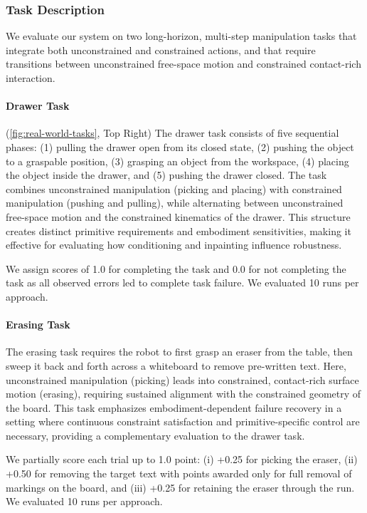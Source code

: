 \subsubsection{Task Description}  
We evaluate our system on two long-horizon, multi-step manipulation tasks that integrate both unconstrained and constrained actions, and that require transitions between unconstrained free-space motion and constrained contact-rich interaction. 

\paragraph{Drawer Task} (\cref{fig:real-world-tasks}, Top Right)
The drawer task consists of five sequential phases: (1) pulling the drawer open from its closed state, (2) pushing the object to a graspable position, (3) grasping an object from the workspace, (4) placing the object inside the drawer, and (5) pushing the drawer closed. The task combines unconstrained manipulation (picking and placing) with constrained manipulation (pushing and pulling), while alternating between unconstrained free-space motion and the constrained kinematics of the drawer. This structure creates distinct primitive requirements and embodiment sensitivities, making it effective for evaluating how conditioning and inpainting influence robustness. 

We assign scores of 1.0 for completing the task and 0.0 for not completing the task as all observed errors led to complete task failure. We evaluated 10 runs per approach.

\paragraph{Erasing Task}  
The erasing task requires the robot to first grasp an eraser from the table, then sweep it back and forth across a whiteboard to remove pre-written text. Here, unconstrained manipulation (picking) leads into constrained, contact-rich surface motion (erasing), requiring sustained alignment with the constrained geometry of the board. This task emphasizes embodiment-dependent failure recovery in a setting where continuous constraint satisfaction and primitive-specific control are necessary, providing a complementary evaluation to the drawer task. 

We partially score each trial up to 1.0 point: (i) +0.25 for picking the eraser, (ii) +0.50 for removing the target text with points awarded only for full removal of markings on the board, and (iii) +0.25 for retaining the eraser through the run. We evaluated 10 runs per approach.

